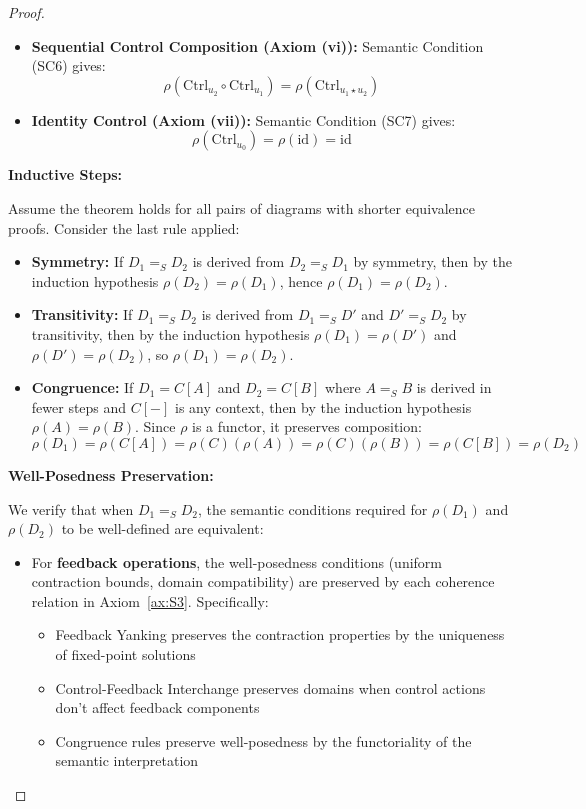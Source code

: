 \documentclass[11pt]{article}
\begin{document}
\begin{proof}
\begin{itemize}
\begin{itemize}
        \item \textbf{Sequential Control Composition (Axiom (vi)):} Semantic Condition (SC6) gives:
        \[
        \rho(\mathrm{Ctrl}_{u_2} \circ \mathrm{Ctrl}_{u_1}) = \rho(\mathrm{Ctrl}_{u_1 \star u_2})
        \]
        
        \item \textbf{Identity Control (Axiom (vii)):} Semantic Condition (SC7) gives:
        \[
        \rho(\mathrm{Ctrl}_{u_0}) = \rho(\mathrm{id}) = \mathrm{id}
        \]
    \end{itemize}
\end{itemize}

\noindent\textbf{Inductive Steps:}

Assume the theorem holds for all pairs of diagrams with shorter equivalence proofs. Consider the last rule applied:

\begin{itemize}
    \item \textbf{Symmetry:} If $D_1 =_S D_2$ is derived from $D_2 =_S D_1$ by symmetry, then by the induction hypothesis $\rho(D_2) = \rho(D_1)$, hence $\rho(D_1) = \rho(D_2)$.
    
    \item \textbf{Transitivity:} If $D_1 =_S D_2$ is derived from $D_1 =_S D'$ and $D' =_S D_2$ by transitivity, then by the induction hypothesis $\rho(D_1) = \rho(D')$ and $\rho(D') = \rho(D_2)$, so $\rho(D_1) = \rho(D_2)$.
    
    \item \textbf{Congruence:} If $D_1 = C[A]$ and $D_2 = C[B]$ where $A =_S B$ is derived in fewer steps and $C[-]$ is any context, then by the induction hypothesis $\rho(A) = \rho(B)$. Since $\rho$ is a functor, it preserves composition:
    \[
    \rho(D_1) = \rho(C[A]) = \rho(C)(\rho(A)) = \rho(C)(\rho(B)) = \rho(C[B]) = \rho(D_2)
    \]
\end{itemize}

\noindent\textbf{Well-Posedness Preservation:}

We verify that when $D_1 =_S D_2$, the semantic conditions required for $\rho(D_1)$ and $\rho(D_2)$ to be well-defined are equivalent:

\begin{itemize}
    \item For \textbf{feedback operations}, the well-posedness conditions (uniform contraction bounds, domain compatibility) are preserved by each coherence relation in Axiom~\ref{ax:S3}. Specifically:
    \begin{itemize}
        \item Feedback Yanking preserves the contraction properties by the uniqueness of fixed-point solutions
        \item Control-Feedback Interchange preserves domains when control actions don't affect feedback components
        \item Congruence rules preserve well-posedness by the functoriality of the semantic interpretation
    \end{itemize}
    

\end{itemize}
\end{proof}
\end{document}

